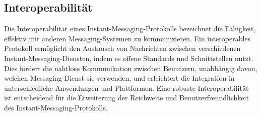\subsection{Interoperabilität}

Die Interoperabilität eines Instant-Messaging-Protokolls bezeichnet die Fähigkeit, effektiv mit anderen Messaging-Systemen zu kommunizieren. Ein interoperables Protokoll ermöglicht den Austausch von Nachrichten zwischen verschiedenen Instant-Messaging-Diensten, indem es offene Standards und Schnittstellen nutzt. Dies fördert die nahtlose Kommunikation zwischen Benutzern, unabhängig davon, welchen Messaging-Dienst sie verwenden, und erleichtert die Integration in unterschiedliche Anwendungen und Plattformen. Eine robuste Interoperabilität ist entscheidend für die Erweiterung der Reichweite und Benutzerfreundlichkeit des Instant-Messaging-Protokolls.
